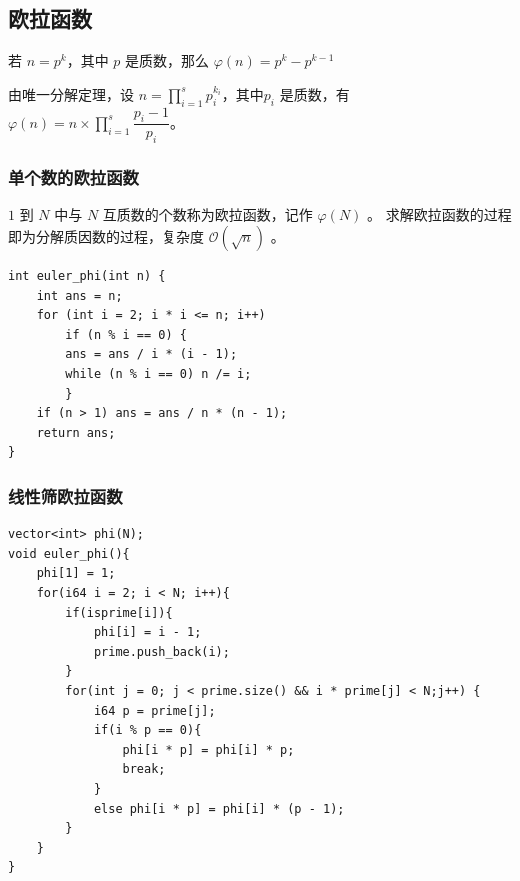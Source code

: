 \subsection{欧拉函数}
若 $n = p^k$，其中 $p$ 是质数，那么 $\varphi(n) = p^k - p^{k - 1}$

由唯一分解定理，设 
$n = \prod_{i=1}^{s}p_i^{k_i}$，其中$p_i$ 是质数，有 
$\varphi(n) = n \times \prod_{i = 1}^s{\dfrac{p_i - 1}{p_i}}$。
\subsubsection{单个数的欧拉函数}
$1$ 到 $N$ 中与 $N$ 互质数的个数称为欧拉函数，记作 $\varphi (N)$ 。
求解欧拉函数的过程即为分解质因数的过程，复杂度 $\mathcal{O}(\sqrt{n})$ 。
\begin{lstlisting}[caption={}]
int euler_phi(int n) {
    int ans = n;
    for (int i = 2; i * i <= n; i++)
        if (n % i == 0) {
        ans = ans / i * (i - 1);
        while (n % i == 0) n /= i;
        }
    if (n > 1) ans = ans / n * (n - 1);
    return ans;
}
\end{lstlisting}

\subsubsection{线性筛欧拉函数}
\begin{lstlisting}[caption={}]
vector<int> phi(N);
void euler_phi(){
    phi[1] = 1;
    for(i64 i = 2; i < N; i++){
        if(isprime[i]){
            phi[i] = i - 1;
            prime.push_back(i);
        }
        for(int j = 0; j < prime.size() && i * prime[j] < N;j++) {
            i64 p = prime[j];
            if(i % p == 0){
                phi[i * p] = phi[i] * p;
                break;
            }
            else phi[i * p] = phi[i] * (p - 1);
        }
    }
}
\end{lstlisting}

